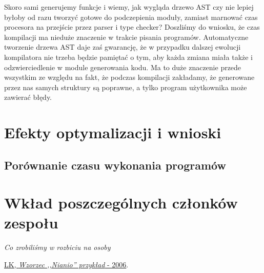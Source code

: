 \documentclass[licencjacka]{pracamgr}
\begin{document}
Skoro sami generujemy funkcje i wiemy, jak wygląda drzewo AST czy nie lepiej byłoby od razu tworzyć gotowe do podczepienia moduły,
zamiast marnować czas procesora na przejście przez parser i type checker? Doszliśmy do wniosku, że czas kompilacji ma nieduże znaczenie w trakcie pisania programów.
Automatyczne tworzenie drzewa AST daje zaś gwarancję, że w przypadku dalszej ewolucji kompilatora nie trzeba będzie pamiętać o tym,
aby każda zmiana miała także i odzwierciedlenie w module generowania kodu. Ma to duże znaczenie przede wszystkim ze względu na fakt,
że podczas kompilacji zakładamy, że generowane przez nas samych struktury są poprawne, a tylko program użytkownika może zawierać błędy.

\chapter{Efekty optymalizacji i wnioski}
\section{Porównanie czasu wykonania programów}

\chapter{Wkład poszczególnych członków zespołu}
\emph{Co zrobiliśmy w rozbiciu na osoby}


\appendix

\begin{thebibliography}{99}

 \href{https://www.mimuw.edu.pl/~chrzaszc/BPJ20067/nianio.pdf}{LK, \textit{Wzorzec ,,Nianio'' przykład} - 2006}.

\end{thebibliography}
\end{document}
